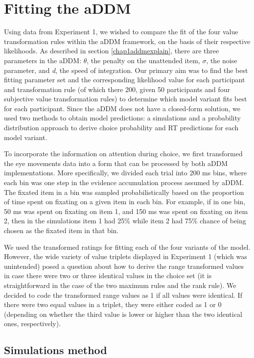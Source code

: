 \documentclass[11pt,a4paper]{article}
\begin{document}
\section{Fitting the aDDM}

Using data from Experiment 1, we wished to compare the fit of the four value transformation rules within the aDDM framework, on the basis of their respective likelihoods. As described in section \ref{chap1addmexplain}, there are three parameters in the aDDM: $\theta$, the penalty on the unattended item, $\sigma$, the noise parameter, and \textit{d}, the speed of integration. Our primary aim was to find the best fitting parameter set and the corresponding likelihood value for each participant and transformation rule (of which there 200, given 50 participants and four subjective value transformation rules) to determine which model variant fits best for each participant. Since the aDDM does not have a closed-form solution, we used two methods to obtain model predictions: a simulations and a probability distribution approach to derive choice probability and RT predictions for each model variant.

To incorporate the information on attention during choice, we first transformed the eye movements data into a form that can be processed by both aDDM implementations. More specifically, we divided each trial into 200 ms bins, where each bin was one step in the evidence accumulation process assumed by aDDM. The fixated item in a bin was sampled probabilistically based on the proportion of time spent on fixating on a given item in each bin. For example, if in one bin, 50 ms was spent on fixating on item 1, and 150 ms was spent on fixating on item 2, then in the simulations item 1 had 25\% while item 2 had 75\% chance of being chosen as the fixated item in that bin. 

We used the transformed ratings for fitting each of the four variants of the model. However, the wide variety of value triplets displayed in Experiment 1 (which was unintended) posed a question about how to derive the range transformed values in case there were two or three identical values in the choice set (it is straightforward in the case of the two maximum rules and the rank rule). We decided to code the transformed range values as 1 if all values were identical. If there were two equal values in a triplet, they were either coded as 1 or 0 (depending on whether the third value is lower or higher than the two identical ones, respectively). 

\subsection{Simulations method}
\end{document}
